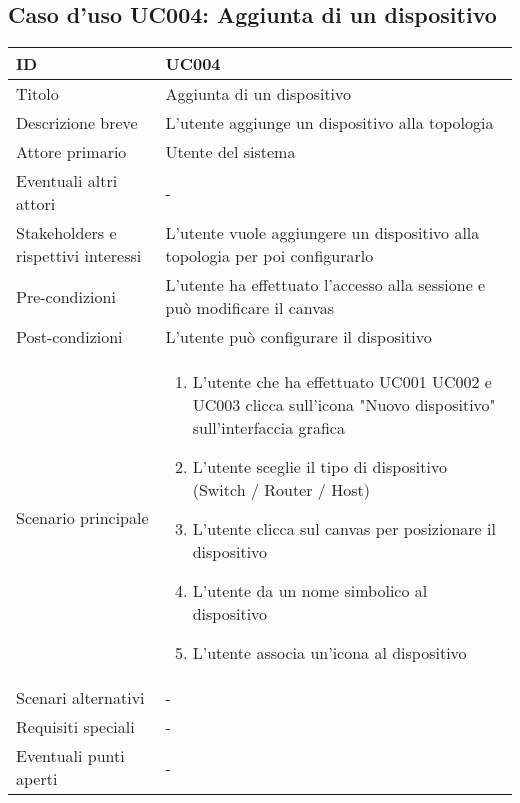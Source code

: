 \documentclass[../../main.tex]{subfiles}
\begin{document}
\subsection{Caso d’uso UC004: Aggiunta di un dispositivo }
\begin{tabularx}{150mm}{|l|X|}
    \hline
    ID                                  & \textbf{UC004}\\
    \hline
    Titolo                              & Aggiunta di un dispositivo \\
    \hline
    Descrizione breve                   & L'utente aggiunge un dispositivo alla topologia   \\
    \hline
    Attore primario                     & Utente del sistema  \\
    \hline
    Eventuali altri attori              & -   \\
    \hline
    Stakeholders e rispettivi interessi & L'utente vuole aggiungere un dispositivo alla topologia per poi configurarlo \\
    \hline
    Pre-condizioni                      & L'utente ha effettuato l'accesso alla sessione e può modificare il canvas   \\
    \hline
    Post-condizioni                     & L'utente può configurare il dispositivo   \\
    \hline
    Scenario principale                 & 
    \begin {enumerate}
\item L'utente che ha effettuato UC001 UC002 e UC003 clicca sull'icona "Nuovo dispositivo" sull'interfaccia grafica
\item L'utente sceglie il tipo di dispositivo (Switch / Router / Host)
\item L'utente clicca sul canvas per posizionare il dispositivo
\item L'utente da un nome simbolico al dispositivo
\item L'utente associa un'icona al dispositivo
    \end {enumerate}
    
    \\
    \hline
    Scenari alternativi                 & -   \\
    \hline
    Requisiti speciali                  & -   \\
    \hline
    Eventuali punti aperti              & -  \\
    \hline
\end{tabularx}
\newpage
\end{document}
